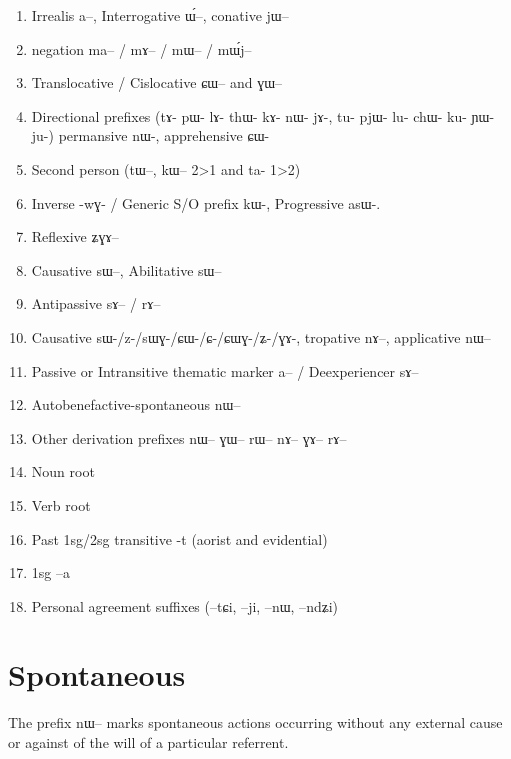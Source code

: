 \documentclass[oldfontcommands,oneside,a4paper,11pt]{article}
\newcommand{\ipa}[1]{{\phon \mbox{#1}}} %
\begin{document}
\begin{landscape}
\begin{multicols}{2}
\begin{enumerate}
\item Irrealis  \ipa{a}--, Interrogative \ipa{ɯ́}--, conative \ipa{jɯ}--
\item negation \ipa{ma}-- / \ipa{mɤ}-- / \ipa{mɯ}-- / \ipa{mɯ́j}--
\item Translocative / Cislocative \ipa{ɕɯ}-- and \ipa{ɣɯ}--
\item Directional prefixes (tɤ- pɯ- lɤ- thɯ- kɤ- nɯ- jɤ-, tu- pjɯ- lu- chɯ- ku- ɲɯ- ju-) permansive nɯ-, apprehensive ɕɯ-
\item Second person (\ipa{tɯ}--, \ipa{kɯ}-- 2>1 and ta- 1>2)
\item Inverse -\ipa{wɣ}- / Generic S/O prefix \ipa{kɯ}-, Progressive \ipa{asɯ}-. 
\item Reflexive \ipa{ʑɣɤ}-- 
\item Causative \ipa{sɯ}--, Abilitative \ipa{sɯ}--
\item  Antipassive  \ipa{sɤ}-- / \ipa{rɤ}--
\item Causative sɯ-/z-/sɯɣ-/ɕɯ-/ɕ-/ɕɯɣ-/ʑ-/ɣɤ-, tropative \ipa{nɤ}--, applicative \ipa{nɯ}--
\item Passive or Intransitive thematic marker \ipa{a}-- / Deexperiencer \ipa{sɤ}--
\item Autobenefactive-spontaneous \ipa{nɯ}--
\item Other derivation prefixes \ipa{nɯ}-- \ipa{ɣɯ}-- \ipa{rɯ}-- \ipa{nɤ}-- \ipa{ɣɤ}-- \ipa{rɤ}--
\item Noun root
\item Verb root 
\item Past 1sg/2sg transitive -\ipa{t} (aorist and evidential)
\item 1sg --\ipa{a}
\item Personal agreement suffixes (--\ipa{tɕi}, --\ipa{ji}, --\ipa{nɯ}, --\ipa{ndʑi})
\end{enumerate}


\end{multicols}
  \end{landscape}
 
 
 
 
 
\section{Spontaneous}
The prefix \ipa{nɯ--} marks spontaneous actions  occurring without any external cause or against of the will of a particular referrent.
\end{document}
